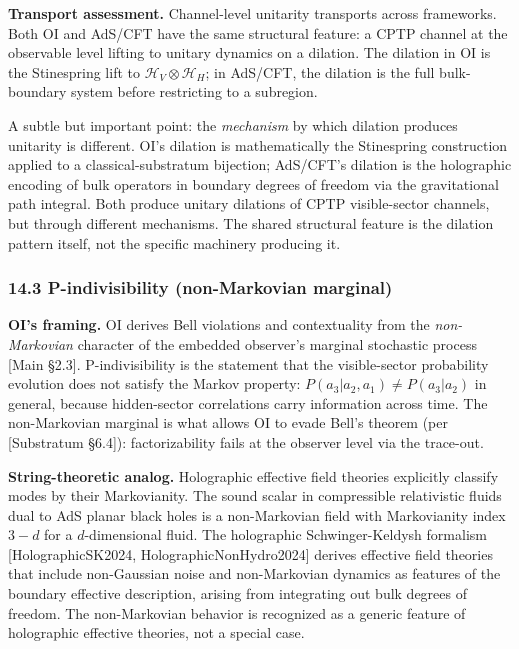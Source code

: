 \documentclass[
]{article}
\begin{document}
\textbf{Transport assessment.} Channel-level unitarity transports across
frameworks. Both OI and AdS/CFT have the same structural feature: a CPTP
channel at the observable level lifting to unitary dynamics on a
dilation. The dilation in OI is the Stinespring lift to
\(\mathcal{H}_V \otimes \mathcal{H}_H\); in AdS/CFT, the dilation is the
full bulk-boundary system before restricting to a subregion.

A subtle but important point: the \emph{mechanism} by which dilation
produces unitarity is different. OI's dilation is mathematically the
Stinespring construction applied to a classical-substratum bijection;
AdS/CFT's dilation is the holographic encoding of bulk operators in
boundary degrees of freedom via the gravitational path integral. Both
produce unitary dilations of CPTP visible-sector channels, but through
different mechanisms. The shared structural feature is the dilation
pattern itself, not the specific machinery producing it.

\hypertarget{p-indivisibility-non-markovian-marginal}{%
\subsubsection{14.3 P-indivisibility (non-Markovian
marginal)}\label{p-indivisibility-non-markovian-marginal}}

\textbf{OI's framing.} OI derives Bell violations and contextuality from
the \emph{non-Markovian} character of the embedded observer's marginal
stochastic process {[}Main §2.3{]}. P-indivisibility is the statement
that the visible-sector probability evolution does not satisfy the
Markov property: \(P(a_3 | a_2, a_1) \neq P(a_3 | a_2)\) in general,
because hidden-sector correlations carry information across time. The
non-Markovian marginal is what allows OI to evade Bell's theorem (per
{[}Substratum §6.4{]}): factorizability fails at the observer level via
the trace-out.

\textbf{String-theoretic analog.} Holographic effective field theories
explicitly classify modes by their Markovianity. The sound scalar in
compressible relativistic fluids dual to AdS planar black holes is a
non-Markovian field with Markovianity index \(3 - d\) for a
\(d\)-dimensional fluid. The holographic Schwinger-Keldysh formalism
{[}HolographicSK2024, HolographicNonHydro2024{]} derives effective field
theories that include non-Gaussian noise and non-Markovian dynamics as
features of the boundary effective description, arising from integrating
out bulk degrees of freedom. The non-Markovian behavior is recognized as
a generic feature of holographic effective theories, not a special case.
\end{document}
